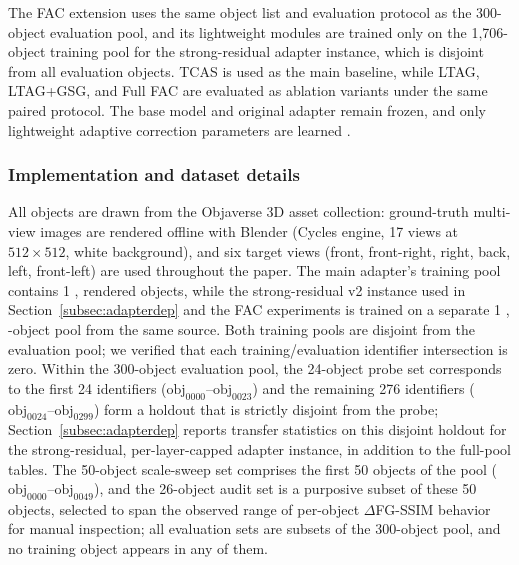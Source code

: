 \documentclass[times,twocolumn,final]{elsarticle}
\providecommand{\DIFadd}[1]{{\protect\color{blue} \sf #1}} %
\providecommand{\DIFaddbegin}{} %
\providecommand{\DIFaddend}{} %
\newcommand{\DIFaddincludegraphics}[2][]{{\color{blue}\fbox{\DIFOincludegraphics[#1]{#2}}}} %
\DeclareRobustCommand{\DIFaddbegin}{\DIFOaddbegin \let\includegraphics\DIFaddincludegraphics} %
\DeclareRobustCommand{\DIFaddend}{\DIFOaddend \let\includegraphics\DIFOincludegraphics} %
\begin{document}
The FAC extension uses the same object list and evaluation protocol as the 300-object   \DIFaddbegin \DIFadd{evaluation pool, and its lightweight modules are trained only on the 1,706-object training pool for the strong-residual adapter instance, which is disjoint from all evaluation objects}\DIFaddend . TCAS is used as the main baseline, while LTAG, LTAG+GSG, and Full FAC are evaluated as ablation variants   \DIFaddbegin \DIFadd{under the same paired protocol}\DIFaddend . The base model and original adapter remain frozen, and only lightweight adaptive correction parameters are learned  \DIFaddbegin \DIFadd{.
}

\subsubsection{\DIFadd{Implementation and dataset details}}

\DIFadd{All objects are drawn from the Objaverse 3D asset collection: ground-truth multi-view images are rendered offline with Blender (Cycles engine, 17 views at $512\times512$, white background), and six target views (front, front-right, right, back, left, front-left) are used throughout the paper. The main adapter's training pool contains 1}{\DIFadd{,}}\DIFadd{118 rendered objects, while the strong-residual v2 instance used in Section~\ref{subsec:adapterdep} and the FAC experiments is trained on a separate 1}{\DIFadd{,}}\DIFadd{706-object pool from the same source. Both training pools are disjoint from the evaluation pool; we verified that each training/evaluation identifier intersection is zero. Within the 300-object evaluation pool, the 24-object probe set corresponds to the first 24 identifiers ($\mathrm{obj}_{0000}$--$\mathrm{obj}_{0023}$) and the remaining 276 identifiers ($\mathrm{obj}_{0024}$--$\mathrm{obj}_{0299}$) form a holdout that is strictly disjoint from the probe; Section~\ref{subsec:adapterdep} reports transfer statistics on this disjoint holdout for the strong-residual, per-layer-capped adapter instance, in addition to the full-pool tables. The 50-object scale-sweep set comprises the first 50 objects of the pool ($\mathrm{obj}_{0000}$--$\mathrm{obj}_{0049}$), and the 26-object audit set is a purposive subset of these 50 objects, selected to span the observed range of per-object $\Delta$FG-SSIM behavior for manual inspection; all evaluation sets are subsets of the 300-object pool, and no training object appears in any of them.
}
\end{document}
